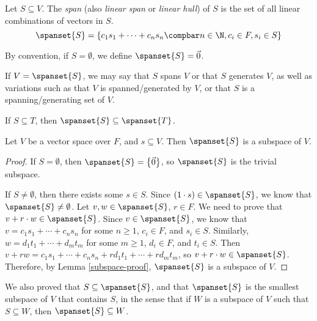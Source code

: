 \documentclass[12pt]{article}
\begin{document}
\begin{defn}
    Let $S \subseteq V$. The \emph{span} (also \emph{linear span} or \emph{linear hull}) of $S$ is the set of all linear combinations of vectors in $S$. \[\spanset{S} = \left\{c_1s_1 + \cdots + c_ns_n \compbar n \in \N, c_i \in F, s_i \in S\right\}\]

    By convention, if $S = \emptyset$, we define $\spanset{S} = \vec{0}$.
\end{defn}

\begin{rmk}
    If $V = \spanset{S}$, we may say that $S$ spans $V$ or that $S$ generates $V$, as well as variations such as that $V$ is spanned/generated by $V$, or that $S$ is a spanning/generating set of $V$.
\end{rmk}

\begin{rmk}
    If $S \subseteq T$, then $\spanset{S} \subseteq \spanset{T}$.
\end{rmk}

\begin{lemma}
    Let $V$ be a vector space over $F$, and $s \subseteq V$. Then $\spanset{S}$ is a subspace of $V$.
\end{lemma}

\begin{proof}
    If $S = \emptyset$, then $\spanset{S} = \left\{\vec{0}\right\}$, so $\spanset{S}$ is the trivial subspace.

    If $S \neq \emptyset$, then there exists some $s \in S$. Since $(1 \cdot s) \in \spanset{S}$, we know that $\spanset{S} \neq \emptyset$. Let $v, w \in \spanset{S}$, $r \in F$. We need to prove that $v + r \cdot w \in \spanset{S}$. Since $v \in \spanset{S}$, we know that $v = c_1s_1 + \cdots + c_ns_n$ for some $n \geq 1$, $c_i \in F$, and $s_i \in S$. Similarly, $w = d_1t_1 + \cdots + d_mt_m$ for some $m \geq 1$, $d_i \in F$, and $t_i \in S$. Then $v + rw = c_1s_1 + \cdots + c_ns_n + rd_1t_1 + \cdots + rd_mt_m$, so $v + r \cdot w \in \spanset{S}$. Therefore, by Lemma \ref{subspace-proof}, $\spanset{S}$ is a subspace of $V$.
\end{proof}

\begin{rmk}
    We also proved that $S \subseteq \spanset{S}$, and that $\spanset{S}$ is the smallest subspace of $V$ that contains $S$, in the sense that if $W$ is a subspace of $V$ such that $S \subseteq W$, then $\spanset{S} \subseteq W$.
\end{rmk}
\end{document}
